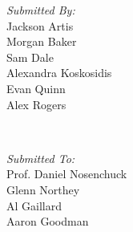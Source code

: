 \begin{titlepage}
\begin{minipage}[t]{0.4\textwidth}
\begin{flushleft} \large
\emph{Submitted By:}\\
Jackson Artis\\
Morgan Baker\\
Sam Dale\\
Alexandra Koskosidis\\
Evan Quinn\\
Alex Rogers
\end{flushleft}
\end{minipage}
~
\begin{minipage}[t]{0.4\textwidth}
\begin{flushright} \large
\emph{Submitted To:} \\
Prof. Daniel Nosenchuck\\
Glenn Northey\\
Al Gaillard\\
Aaron Goodman\\
\end{flushright}
\end{minipage}\\[1cm]

\vfill %

\end{titlepage}


%